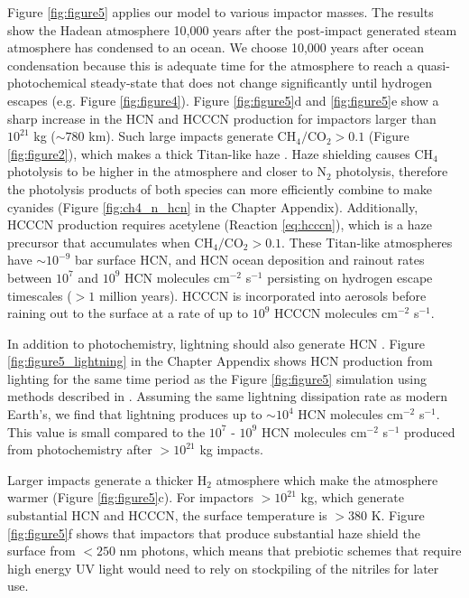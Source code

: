 Figure \ref{fig:figure5} applies our model to various impactor masses. The results show the Hadean atmosphere 10,000 years after the post-impact generated steam atmosphere has condensed to an ocean. We choose 10,000 years after ocean condensation because this is adequate time for the atmosphere to reach a quasi-photochemical steady-state that does not change significantly until hydrogen escapes (e.g. Figure \ref{fig:figure4}). Figure \ref{fig:figure5}d and \ref{fig:figure5}e show a sharp increase in the HCN and HCCCN production for impactors larger than $10^{21}$ kg ($\sim 780$ km). Such large impacts generate $\mathrm{CH_4}/\mathrm{CO_2} > 0.1$ (Figure \ref{fig:figure2}), which makes a thick Titan-like haze \citep{Trainer_2006}. Haze shielding causes CH$_4$ photolysis to be higher in the atmosphere and closer to N$_2$ photolysis, therefore the photolysis products of both species can more efficiently combine to make cyanides (Figure \ref{fig:ch4_n_hcn} in the Chapter Appendix). Additionally, HCCCN production requires acetylene (Reaction \ref{eq:hcccn}), which is a haze precursor that accumulates when $\mathrm{CH_4}/\mathrm{CO_2} > 0.1$. These Titan-like atmospheres have $\sim 10^{-9}$ bar surface HCN, and HCN ocean deposition and rainout rates between $10^7$ and $10^9$ HCN molecules cm$^{-2}$ s$^{-1}$ persisting on hydrogen escape timescales ($> 1$ million years). HCCCN is incorporated into aerosols before raining out to the surface at a rate of up to $10^9$ HCCCN molecules cm$^{-2}$ s$^{-1}$.

In addition to photochemistry, lightning should also generate HCN \citep{Chameides_1981,Stribling_1987}. Figure \ref{fig:figure5_lightning} in the Chapter Appendix shows HCN production from lighting for the same time period as the Figure \ref{fig:figure5} simulation using methods described in \citet{Chameides_1981}. Assuming the same lightning dissipation rate as modern Earth's, we find that lightning produces up to $\sim 10^{4}$ HCN molecules cm$^{-2}$ s$^{-1}$. This value is small compared to the $10^{7}$ - $10^{9}$ HCN molecules cm$^{-2}$ s$^{-1}$ produced from photochemistry after $> 10^{21}$ kg impacts.

Larger impacts generate a thicker H$_2$ atmosphere which make the atmosphere warmer (Figure \ref{fig:figure5}c). For impactors $> 10^{21}$ kg, which generate substantial HCN and HCCCN, the surface temperature is $> 380$ K. Figure \ref{fig:figure5}f shows that impactors that produce substantial haze shield the surface from $< 250$ nm photons, which means that prebiotic schemes that require high energy UV light \citep[e.g.,][]{Patel_2015} would need to rely on stockpiling of the nitriles for later use. 


